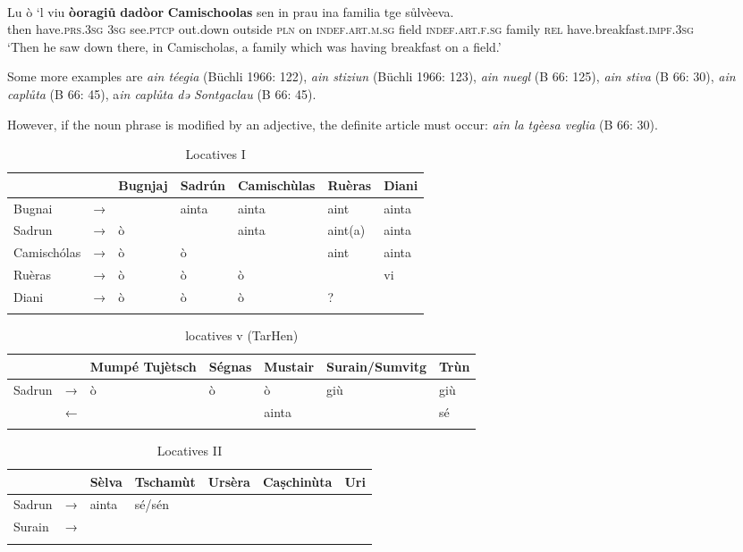 \ea\label{}
\\
\gll Lu ò ‘l viu \textbf{òoragiů} \textbf{dadòor} \textbf{Camischoolas} sen in prau ina familia tge sůlvèeva.\\
     then have.\textsc{prs.3sg} \textsc{3sg} see.\textsc{ptcp} out.down outside \textsc{pln} on \textsc{indef.art.m.sg} field \textsc{indef.art.f.sg} family \textsc{rel} have.breakfast.\textsc{impf.3sg}\\
\glt `Then he saw down there, in Camischolas, a family which was having breakfast on a field.'
\z


Some more examples are \textit{ain téegia} (Büchli 1966: 122), \textit{ain stiziun} (Büchli 1966: 123), \textit{ain nuegl} (B 66: 125), \textit{ain stiva} (B 66: 30), \textit{ain caplůta} (B 66: 45), a\textit{in caplůta dǝ Sontgaclau} (B 66: 45). 

However, if the noun phrase is modified by an adjective, the definite article must occur: \textit{ain la tgèesa veglia} (B 66: 30).


\begin{table}
\caption{Locatives I}
\label{locative1}
 \begin{tabular}{lllllll}
  \lsptoprule
            & & Bugnjaj & Sadrún & Camischùlas & Ruèras & Diani \\
  \midrule
  Bugnai  & →&   & ainta & ainta & aint & ainta\\
  Sadrun & → & ò  &  & ainta & aint(a) & ainta\\
Camischólas & →& ò & ò & & aint & ainta\\
Ruèras & →& ò & ò & ò & & vi\\
Diani & →& ò & ò & ò & ? &\\
  \lspbottomrule
 \end{tabular}
\end{table}

\begin{table}
\caption{locatives v (TarHen)}
\label{}
 \begin{tabular}{lllllll}
  \lsptoprule
     &       & Mumpé Tujètsch & Ségnas & Mustair & Surain/Sumvitg & Trùn\\ 
  \midrule
  Sadrun  & →  & ò &    ò  &    ò     & giù & giù\\
 & ← & & & ainta &   & sé \\
  \lspbottomrule
 \end{tabular}
\end{table}


\begin{table}
\caption{Locatives II}
\label{locative2}
 \begin{tabular}{lllllll}
  \lsptoprule
            & & Sèlva & Tschamùt & Ursèra & Caṣchinùta & Uri\\ 
  \midrule
  Sadrun  & →   & ainta    & sé/sén     &  & \\
  Surain  & →   &    &        & \\
  \lspbottomrule
 \end{tabular}
\end{table}

